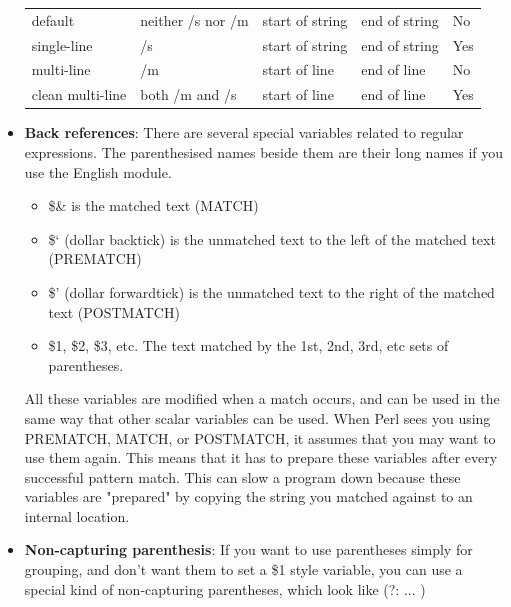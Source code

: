 \documentclass{report}
\begin{document}
\begin{itemize}
\begin{center}
\begin{tabularx}{\textwidth}{@{}XXXXl@{}}
                    \midrule
                    default &neither /s nor /m &start of string &end of string &No\\[2ex]
                    single-line &/s &start of string &end of string &Yes\\[2ex]
                    multi-line &/m &start of line &end of line &No\\[2ex]
                    clean multi-line &both /m and /s& start of line &end of line &Yes \\
                    \bottomrule
                \end{tabularx}
            \end{center}
        \item \textbf{Back references}: There are several special variables related to regular expressions. The parenthesised names beside them are their long names if you use the English module.
            \begin{itemize}
                \item \$\& is the matched text (MATCH)
                \item \$‘ (dollar backtick) is the unmatched text to the left of the matched text (PREMATCH)
                \item \$’ (dollar forwardtick) is the unmatched text to the right of the matched text (POSTMATCH)
                \item \$1, \$2, \$3, etc. The text matched by the 1st, 2nd, 3rd, etc sets of parentheses.
            \end{itemize}
            All these variables are modified when a match occurs, and can be used in the same way that other scalar variables can be used.
            \bigbreak \noindent 
            When Perl sees you using PREMATCH, MATCH, or POSTMATCH, it assumes that you may want to use them again. This means that it has to prepare these variables after every successful pattern match. This can slow a program down because these variables are "prepared" by copying the string you matched against to an internal location.
        \item \textbf{Non-capturing parenthesis}: If you want to use parentheses simply for grouping, and don’t want them to set a \$1 style variable, you can use a special kind of non-capturing parentheses, which look like (?: ... )

    \end{itemize}

    \pagebreak 
\end{document}
